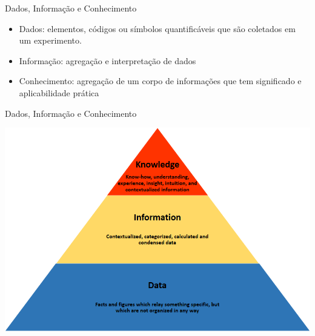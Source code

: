 \documentclass{beamer}
\begin{document}
\begin{frame}{Dados, Informação e Conhecimento}
  \begin{itemize}
  \item Dados: elementos, códigos ou símbolos quantificáveis que são
    coletados em um experimento.
  \item Informação: agregação e interpretação de dados
  \item Conhecimento: agregação de um corpo de informações que tem
    significado e aplicabilidade prática
  \end{itemize}
\end{frame}


\begin{frame}{Dados, Informação e Conhecimento}
  \begin{center}
    \includegraphics[height=0.9\textheight]{Intro/Knowledge_pyramid}
  \end{center}
\end{frame}

\end{document}
